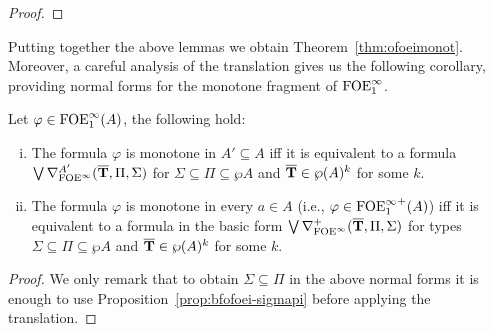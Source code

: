 \begin{proof}
\end{proof}

Putting together the above lemmas we obtain Theorem~\ref{thm:ofoeimonot}. Moreover, a careful analysis of the translation gives us the following corollary, providing normal forms for the monotone fragment of $\ofoei$.

\begin{corollary}\label{cor:ofoeipositivenf}
	Let $\varphi \in \ofoei(A)$, the following hold:
	\begin{enumerate}[(i)]
		\item The formula $\varphi$ is monotone in $A' \subseteq A$ iff it is equivalent to a formula $\bigvee \mondbnfofoei{\vlist{T}}{\Pi}{\Sigma}{A'}$ for $\Sigma\subseteq\Pi \subseteq \wp A$ and $\vlist{T} \in \wp(A)^k$ for some $k$.
		\item The formula $\varphi$ is monotone in every $a\in A$ (i.e., $\varphi\in{\ofoei}^+(A)$) iff it is equivalent to a formula in the basic form $\bigvee \posdbnfofoei{\vlist{T}}{\Pi}{\Sigma}$ for types $\Sigma\subseteq\Pi \subseteq \wp A$ and $\vlist{T} \in \wp(A)^k$ for some $k$.
	\end{enumerate}
\end{corollary}
\begin{proof}
	We only remark that to obtain $\Sigma\subseteq\Pi$ in the above normal forms it is enough to use Proposition~\ref{prop:bfofoei-sigmapi} before applying the translation.
\end{proof}
